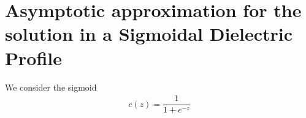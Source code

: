 \documentclass[twocolumn,secnumarabic,amssymb, nobibnotes, aps, prd]{revtex4-1}
\begin{document}







\section{Asymptotic approximation for the solution in a Sigmoidal Dielectric Profile}
We consider the sigmoid
\begin{align}
\label{eqns:Sigmoid}
c(z) = \dfrac{1}{1+e^{-z}}
\end{align}
\end{document}
